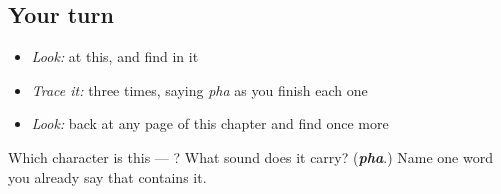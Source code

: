 \subsection*{Your turn}
\begin{itemize}
\raggedright
  \item \emph{Look:} at this, and find  in it
\end{itemize}

\begin{quote}
\end{quote}

\begin{itemize}
\raggedright
  \item \emph{Trace it:}  three times, saying \emph{pha} as you finish each one
  \item \emph{Look:} back at any page of this chapter and find  once more
\end{itemize}

\begin{tcolorbox}[breakable,colback=teal!4,colframe=teal!35!black,title={Before you move on}]
Which character is this — ? What sound does it carry? (\emph{\textbf{pha}}.) Name one word you already say that contains it.
\end{tcolorbox}
